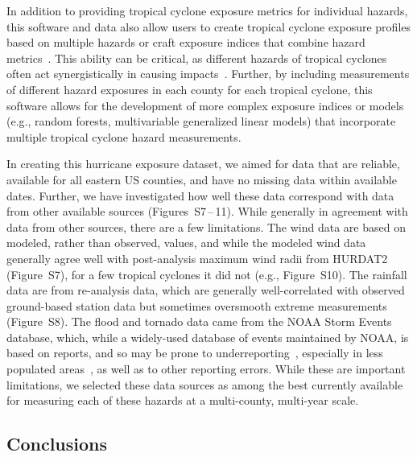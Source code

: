 In addition to providing tropical cyclone exposure metrics for individual
hazards, this software and data also allow users to create tropical cyclone
exposure profiles based on multiple hazards or craft exposure indices that
combine hazard metrics~\citep{chakraborty2005population, peduzzi2009assessing}.
This ability can be critical, as different hazards of tropical cyclones
often act synergistically in causing impacts~\citep{smith2009}. Further, by
including measurements of different hazard exposures in each county for each
tropical cyclone, this software allows for the development of more complex
exposure indices or models (e.g., random forests, multivariable generalized
linear models) that incorporate multiple tropical cyclone hazard measurements.  

In creating this hurricane exposure dataset, we aimed for data that are
reliable, available for all eastern \ac{US} counties, and have no missing data
within available dates. Further, we have investigated how well these data
correspond with data from other available sources (Figures~S7\,--\,11). While
generally in agreement with data from other sources, there are a few
limitations. The wind data are based on modeled, rather than observed, values,
and while the modeled wind data generally agree well with post-analysis maximum
wind radii from \ac{HURDAT2}~\citep{landsea2013} (Figure~S7), for a few
tropical cyclones it did not (e.g., Figure~S10). The rainfall data are from
re-analysis data, which are generally well-correlated with observed
ground-based station data but sometimes oversmooth extreme measurements
(Figure~S8).  The flood and tornado data came from the \ac{NOAA} Storm Events
database, which, while a widely-used database of events maintained by
\ac{NOAA}, is based on reports, and so may be prone to
underreporting~\citep{Ashley2008flood, Curran2000}, especially in less
populated areas~\citep{Witt1998, Ashley2007}, as well as to other reporting
errors. While these are important limitations, we selected these data sources
as among the best currently available for measuring each of these hazards at a
multi-county, multi-year scale.

\subsection*{Conclusions}

